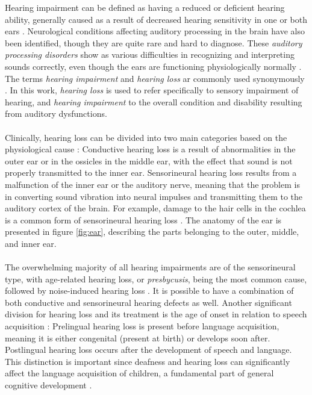 \documentclass[english, 12pt, a4paper, pdftex, elec, utf8]{aaltothesis}
\begin{document}
Hearing impairment can be defined as having a reduced or deficient hearing ability, generally caused as a result of decreased hearing sensitivity in one or both ears \cite{moore2007cochlear, ohlenforst2017effects}. Neurological conditions affecting auditory processing in the brain have also been identified, though they are quite rare and hard to diagnose. These \textit{auditory processing disorders} show as various difficulties in recognizing and interpreting sounds correctly, even though the ears are functioning physiologically normally \cite{deafness}. The terms \textit{hearing impairment} and \textit{hearing loss} ar commonly used synonymously \cite{moore2007cochlear}. In this work, \textit{hearing loss} is used to refer specifically to sensory impairment of hearing, and \textit{hearing impairment} to the overall condition and disability resulting from auditory dysfunctions. \\\\
Clinically, hearing loss can be divided into two main categories based on the physiological cause \cite{moore2007cochlear, deafness}: Conductive hearing loss is a result of abnormalities in the outer ear or in the ossicles in the middle ear, with the effect that sound is not properly transmitted to the inner ear. Sensorineural hearing loss results from a malfunction of the inner ear or the auditory nerve, meaning that the problem is in converting sound vibration into neural impulses and transmitting them to the auditory cortex of the brain. For example, damage to the hair cells in the cochlea is a common form of sensorineural hearing loss \cite{moore2007cochlear}. The anatomy of the ear is presented in figure \ref{fig:ear}, describing the parts belonging to the outer, middle, and inner ear. \\\\
The overwhelming majority of all hearing impairments are of the sensorineural type, with age-related hearing loss, or \textit{presbycusis}, being the most common cause, followed by noise-induced hearing loss \cite{koskela2013kuulokojeen}. It is possible to have a combination of both conductive and sensorineural hearing defects as well. Another significant division for hearing loss and its treatment is the age of onset in relation to speech acquisition \cite{raino2012sisakorvaistutteen, deafness}: Prelingual hearing loss is present before language acquisition, meaning it is either congenital (present at birth) or develops soon after. Postlingual hearing loss occurs after the development of speech and language. This distinction is important since deafness and hearing loss can significantly affect the language acquisition of children, a fundamental part of general cognitive development \cite{moore2007cochlear, wilson2017global, raino2012sisakorvaistutteen}.
\end{document}
